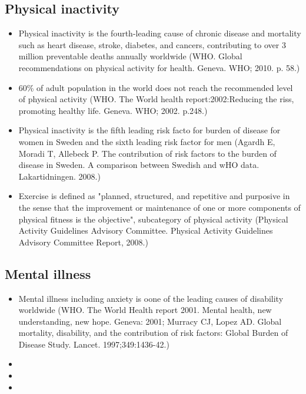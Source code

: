 \documentclass{article}
\begin{document}
\subsection{Physical inactivity}
\begin{itemize}
	\item Physical inactivity is the fourth-leading cause of chronic disease and mortality such as heart disease, stroke, diabetes, and cancers, contributing to over 3 million preventable deaths annually worldwide (WHO. Global recommendations on physical activity for health. Geneva. WHO; 2010. p. 58.)
	\item 60\% of adult population in the world does not reach the recommended level of physical activity (WHO. The World health report:2002:Reducing the riss, promoting healthy life. Geneva. WHO; 2002. p.248.)
	\item Physical inactivity is the fifth leading risk facto for burden of disease for women in Sweden and the sixth leading risk factor for men (Agardh E, Moradi T, Allebeck P. The contribution of risk factors to the burden of disease in Sweden. A comparison between Swedish and wHO data. Lakartidningen. 2008.)
	\item Exercise is defined as "planned, structured, and repetitive and purposive in the sense that the improvement or maintenance of one or more components of physical fitness is the objective", subcategory of physical activity (Physical Activity Guidelines Advisory Committee. Physical Activity Guidelines Advisory Committee Report, 2008.)
\end{itemize}

\subsection{Mental illness}
\begin{itemize}
	\item Mental illness including anxiety is oone of the leading causes of disability worldwide (WHO. The World Health report 2001. Mental health, new understanding, new hope. Geneva: 2001; Murracy CJ, Lopez AD. Global mortality, disability, and the contribution of risk factors: Global Burden of Disease Study. Lancet. 1997;349:1436-42.)
	\item 
	\item 
	\item 
\end{itemize}
\end{document}

